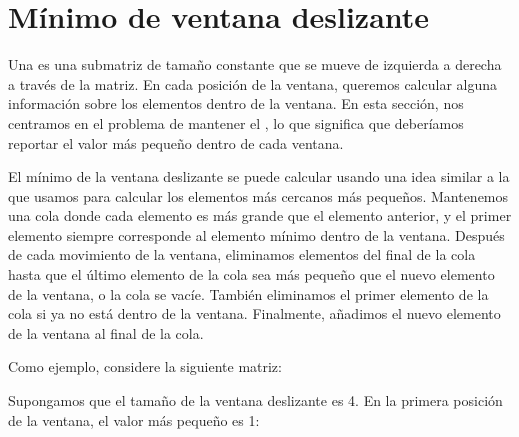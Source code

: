 \section{Mínimo de ventana deslizante}



Una  es una submatriz de tamaño constante
que se mueve de izquierda a derecha a través de la matriz.
En cada posición de la ventana,
queremos calcular alguna información
sobre los elementos dentro de la ventana.
En esta sección, nos centramos en el problema
de mantener el ,
lo que significa que
deberíamos reportar el valor más pequeño dentro de cada ventana.

El mínimo de la ventana deslizante se puede calcular
usando una idea similar a la que usamos para calcular
los elementos más cercanos más pequeños.
Mantenemos una cola
donde cada elemento es más grande que
el elemento anterior,
y el primer elemento
siempre corresponde al elemento mínimo dentro de la ventana.
Después de cada movimiento de la ventana,
eliminamos elementos del final de la cola
hasta que el último elemento de la cola
sea más pequeño que el nuevo elemento de la ventana,
o la cola se vacíe.
También eliminamos el primer elemento de la cola
si ya no está dentro de la ventana.
Finalmente, añadimos el nuevo elemento de la ventana
al final de la cola.

Como ejemplo, considere la siguiente matriz:

\begin{center}
\end{center}

Supongamos que el tamaño de la ventana deslizante es 4.
En la primera posición de la ventana, el valor más pequeño es 1:
\begin{center}
\end{center}

